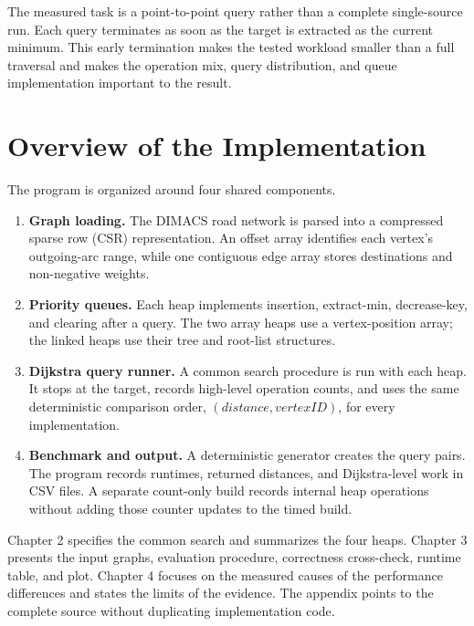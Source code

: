 \documentclass[12pt,a4paper]{report}
\begin{document}
The measured task is a point-to-point query rather than a complete single-source
run. Each query terminates as soon as the target is extracted as the current
minimum. This early termination makes the tested workload smaller than a full
traversal and makes the operation mix, query distribution, and queue
implementation important to the result.

\section{Overview of the Implementation}
The program is organized around four shared components.

\begin{enumerate}
  \item \textbf{Graph loading.} The DIMACS road network is parsed into a
        compressed sparse row (CSR) representation. An offset array identifies
        each vertex's outgoing-arc range, while one contiguous edge array stores
        destinations and non-negative weights.
  \item \textbf{Priority queues.} Each heap implements insertion,
        extract-min, decrease-key, and clearing after a query. The two array
        heaps use a vertex-position array; the linked heaps use their tree and
        root-list structures.
  \item \textbf{Dijkstra query runner.} A common search procedure is run with
        each heap. It stops at the target, records high-level operation counts,
        and uses the same deterministic comparison order, $(distance, vertex
        ID)$, for every implementation.
  \item \textbf{Benchmark and output.} A deterministic generator creates the
        query pairs. The program records runtimes, returned distances, and
        Dijkstra-level work in CSV files. A separate count-only build records
        internal heap operations without adding those counter updates to the
        timed build.
\end{enumerate}

Chapter 2 specifies the common search and summarizes the four heaps. Chapter 3
presents the input graphs, evaluation procedure, correctness cross-check,
runtime table, and plot. Chapter 4 focuses on the measured causes of the
performance differences and states the limits of the evidence. The appendix
points to the complete source without duplicating implementation code.

\end{document}
